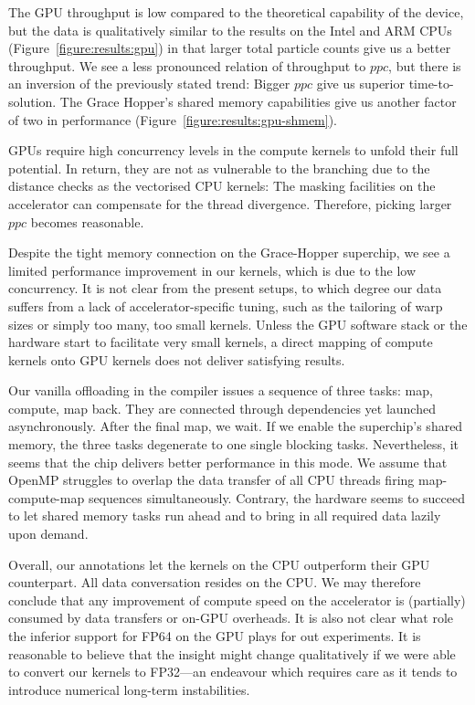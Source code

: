 %
%
The GPU throughput is low compared to the theoretical capability of the device, but the data is qualitatively similar to the results on the Intel and ARM CPUs (Figure~\ref{figure:results:gpu}) in that larger total particle counts give us a better throughput.
We see a less pronounced relation of throughput to $ppc$, but there is an inversion of the previously stated trend:
Bigger $ppc$ give us superior time-to-solution.
The Grace Hopper's shared memory capabilities give us another factor of two in performance (Figure~\ref{figure:results:gpu-shmem}).




%
%
GPUs require high concurrency levels in the compute kernels to unfold their full potential.
In return, they are not as vulnerable to the branching due to the distance checks as the vectorised CPU kernels:
The masking facilities on the accelerator can compensate for the thread divergence.
Therefore, picking larger $ppc$ becomes reasonable.

Despite the tight memory connection on the Grace-Hopper superchip, we see a limited performance improvement in our kernels, which is due to the low concurrency.
It is not clear from the present setups, to which degree our data suffers from a lack of accelerator-specific tuning, such as the tailoring of warp sizes or simply too many, too small kernels.
Unless the GPU software stack or the hardware start to facilitate very small kernels, a direct mapping of compute kernels onto GPU kernels does not deliver satisfying results.

Our vanilla offloading in the compiler issues a sequence of three tasks: map, compute, map back.
They are connected through dependencies yet launched asynchronously.
After the final map, we wait.
If we enable the superchip's shared memory, the three tasks degenerate to one single blocking tasks.
Nevertheless, it seems that the chip delivers better performance in this mode.
We assume that OpenMP struggles to overlap the data transfer of all CPU threads firing map-compute-map sequences simultaneously.
Contrary, the hardware seems to succeed to let shared memory tasks run ahead and to bring in all required data lazily upon demand.

Overall, our annotations let the kernels on the CPU outperform their GPU counterpart. 
All data conversation resides on the CPU.
We may therefore conclude that any improvement of compute speed on the accelerator is (partially) consumed by data transfers or on-GPU overheads.
It is also not clear what role the inferior support for FP64 on the GPU plays for out experiments.
It is reasonable to believe that the insight might change qualitatively if we were able to convert our kernels to FP32---an endeavour which requires care as it tends to introduce numerical long-term instabilities.



